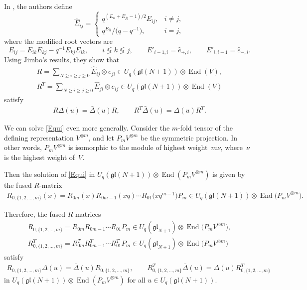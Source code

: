 \documentclass[11pt]{article}
\numberwithin{equation}{section}
\numberwithin{equation}{section}
\DeclareMathOperator{\End}{End}
\newcommand{\Uqgl}{{U_q(\mathfrak{gl}(N+1))}}
\begin{document}
In \cite{GZB}, the authors define
\[
\hat{E}_{ij}
=
\begin{cases}
q^{(E_{ii}+E_{jj}-1)/2}E_{ij}, & i \neq j,\\
q^{E_{ii}}/\big(q-q^{-1}\big), & i=j,
\end{cases}
\]
where the modified root vectors are
\begin{equation*}
E_{ij}= E_{ik}E_{kj} -q^{- 1} E_{kj}E_{ik},\qquad i \lessgtr k \lessgtr j, \qquad E'_{i-1,i} = \hat{e}_{+,i}, \qquad E'_{i,i-1} = \hat{e}_{-,i}.
\end{equation*}
Using Jimbo's results, they show that
\begin{gather*}
R = \sum_{N \geq i\geq j \geq 0} \hat{E}_{ij} \otimes e_{ji} \in \Uqgl \otimes \End (V),\nonumber\\
R^T = \sum_{N \geq i\geq j \geq 0} \hat{E}_{ji} \otimes e_{ij} \in \Uqgl \otimes \End (V) %
\end{gather*}
satisfy
\begin{gather*}
R\Delta(u) = \bar{\Delta}(u) R,\qquad
R^T\bar{\Delta}(u) = {\Delta}(u) R^T.
\end{gather*}

We can solve \eqref{Equi} even more generally. Consider the $ m $-fold tensor of the defining representation $ V^{\otimes m}$, and let $P_mV^{\otimes m}$ be the symmetric projection. In other words, $P_mV^{\otimes m}$ is isomorphic to the module of highest weight~$m\nu$, where~$\nu$ is the highest weight of~$V$.

Then the solution of \eqref{Equi} in $ \Uqgl \otimes \End (P_m V^{\otimes m}) $ is given by the fused $R$-matrix~\cite{Jimbo1986}%
\begin{gather*} %
R^{}_{0,\{1,2,\dots,m\}}(x)= R_{0m}(x)R_{0m-1}(xq) \cdots R_{01}\big(xq^{ m-1}\big) P_m \in \Uqgl\otimes \End \big(P_m V^{\otimes m}\big) .
\end{gather*}

Therefore, the fused $R$-matrices
\begin{gather*}
R^{}_{0,\{1,2,\dots,m\}} = R_{0m}R_{0m-1}\cdots R_{01}P_m \in U_q(\mathfrak{gl}_{N+1})\otimes \End \big(P_m V^{\otimes m}\big), \\
R^{T}_{0,\{1,2,\dots,m\}} = R^T_{0m}R^T_{0m-1}\cdots R^T_{01}P_m \in U_q(\mathfrak{gl}_{N+1})\otimes \End \big(P_m V^{\otimes m}\big)
\end{gather*}
satisfy
\begin{gather}
R_{0,\{1,2,\dots,m\}} \Delta(u) = \bar{\Delta}(u) R_{0,\{1,2,\dots,m\} },\qquad
R^T_{0,\{1,2,\dots,m\}} \bar{\Delta}(u) = {\Delta}(u) R^T_{0,\{1,2,\dots,m\}}\label{RRel}
\end{gather}
in $\Uqgl \otimes \End (P_m V^{\otimes m})$ for all $u\in \Uqgl$.
\end{document}
